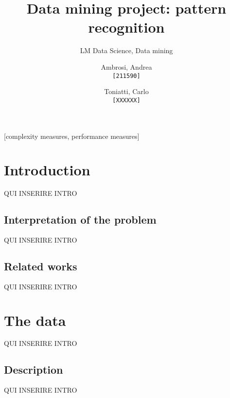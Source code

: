 \documentclass{acm_proc_article-sp-sigmod09}
\begin{document}
	
	
	
	\title{Data mining project: pattern recognition}
	\subtitle{LM Data Science, Data mining}
	
	\author{
		Ambrosi, Andrea\\
		\texttt{[211590]}
		\and
		Toniatti, Carlo\\
		\texttt{[XXXXXX]}
	}
	
	\maketitle
	\begin{abstract}
		
	\end{abstract}
	
	[complexity measures, performance measures]
	
	
	
	\section{Introduction}
	QUI INSERIRE INTRO
	
	\subsection{Interpretation of the problem}
	QUI INSERIRE INTRO
	
	\subsection{Related works}
	QUI INSERIRE INTRO
	
	\section{The data}
	QUI INSERIRE INTRO
	
	\subsection{Description}
	QUI INSERIRE INTRO
	
\end{document}
